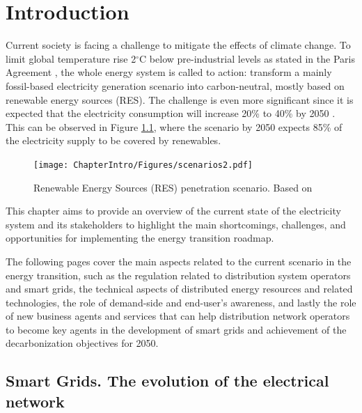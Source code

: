 \renewcommand\labelenumi{(\roman{enumi})}
\renewcommand\theenumi\labelenumi

\chapter{Introduction}
\label{chapterIntro}

Current society is facing a challenge to mitigate the effects of climate change. To limit global temperature rise 2$^{\circ}$C below pre-industrial levels as stated in the Paris Agreement \cite{IPCC2018}, the whole energy system is called to action: transform a mainly fossil-based electricity generation scenario into carbon-neutral, mostly based on renewable energy sources (RES). The challenge is even more significant since it is expected that the electricity consumption will increase 20\% to 40\% by 2050 \cite{IRENA2018}. This can be observed in Figure \ref{fig:scenarios}, where the scenario by 2050 expects 85\% of the electricity supply to be covered by renewables. 

\begin{figure}[htbp]
	\centering 
	\texttt{[image: ChapterIntro/Figures/scenarios2.pdf]}
		\caption{Renewable Energy Sources (RES) penetration scenario. Based on \cite{IRENA2018}}  
		\label{fig:scenarios}
\end{figure}
\newpage
This chapter aims to provide an overview of the current state of the electricity system and its stakeholders to highlight the main shortcomings, challenges, and opportunities for implementing the energy transition roadmap. 

The following pages cover the main aspects related to the current scenario in the energy transition, such as the regulation related to distribution system operators and smart grids, the technical aspects of distributed energy resources and related technologies, the role of demand-side and end-user's awareness, and lastly the role of new business agents and services that can help distribution network operators to become key agents in the development of smart grids and achievement of the decarbonization objectives for 2050. 


\section{Smart Grids. The evolution of the electrical network}

